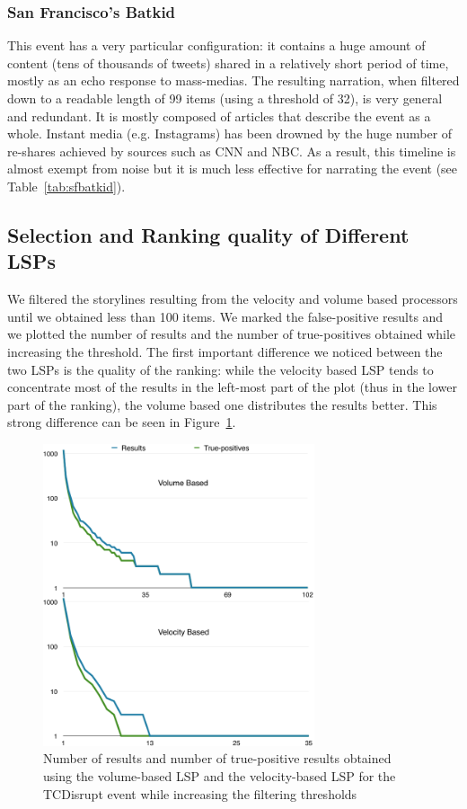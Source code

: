 \documentclass{sig-alternate-somus}
\begin{document}
\subsubsection{San Francisco's Batkid}
This event has a very particular configuration: it contains a huge amount of content (tens of thousands of tweets) shared in a relatively short period of time, mostly as an echo response to mass-medias. The resulting narration, when filtered down to a readable length of 99 items (using a threshold of 32), is very general and redundant. It is mostly composed of articles that describe the event as a whole. Instant media (e.g. Instagrams) has been drowned by the huge number of re-shares achieved by sources such as CNN and NBC. As a result, this timeline is almost exempt from noise but it is much less effective for narrating the event (see Table~\ref{tab:sfbatkid}).

\subsection{Selection and Ranking quality of Different LSPs}
\label{sec:selection_and_ranking_quality}
We filtered the storylines resulting from the velocity and volume based processors until we obtained less than 100 items. We marked the false-positive results and we plotted the number of results and the number of true-positives obtained while increasing the threshold. The first important difference we noticed between the two LSPs is the quality of the ranking: while the velocity based LSP tends to concentrate most of the results in the left-most part of the plot (thus in the lower part of the ranking), the volume based one distributes the results better. This strong difference can be seen in Figure~\ref{fig:tcdisrupt_plots}.
\begin{figure}[htbp]
  \centering
  \includegraphics[width=8cm]{Figures/tcdisrupt_plots.png}
  \caption{Number of results and number of true-positive results obtained using the volume-based LSP and the velocity-based LSP for the TCDisrupt event while increasing the filtering thresholds}
  \label{fig:tcdisrupt_plots}
\end{figure}
\end{document}
